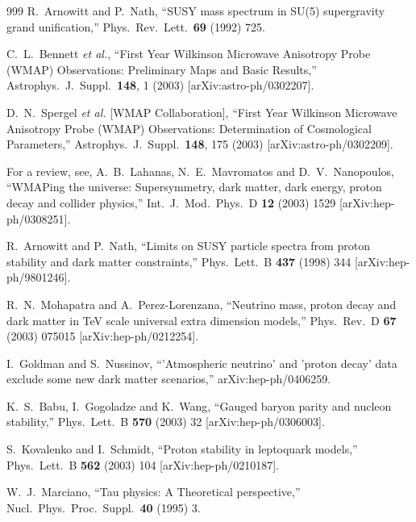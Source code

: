 \begin{thebibliography}{999}
  R.~Arnowitt and P.~Nath,
  ``SUSY mass spectrum in SU(5) supergravity grand unification,''
  Phys.\ Rev.\ Lett.\  {\bf 69} (1992) 725.

C.~L.~Bennett {\it et al.},
``First Year Wilkinson Microwave Anisotropy Probe (WMAP) Observations:
Preliminary Maps and Basic Results,''
Astrophys.\ J.\ Suppl.\  {\bf 148}, 1 (2003)
[arXiv:astro-ph/0302207].

D.~N.~Spergel {\it et al.}  [WMAP Collaboration],
``First Year Wilkinson Microwave Anisotropy Probe (WMAP) Observations:
Determination of Cosmological Parameters,''
Astrophys.\ J.\ Suppl.\  {\bf 148}, 175 (2003)
[arXiv:astro-ph/0302209].

For a review, see, 
  A.~B.~Lahanas, N.~E.~Mavromatos and D.~V.~Nanopoulos,
  ``WMAPing the universe: Supersymmetry, dark matter, dark energy, proton
  decay and collider physics,''
  Int.\ J.\ Mod.\ Phys.\ D {\bf 12} (2003) 1529
  [arXiv:hep-ph/0308251].

  R.~Arnowitt and P.~Nath,
  ``Limits on SUSY particle spectra from proton stability and dark matter
  constraints,''
  Phys.\ Lett.\ B {\bf 437} (1998) 344
  [arXiv:hep-ph/9801246].

  R.~N.~Mohapatra and A.~Perez-Lorenzana,
  ``Neutrino mass, proton decay and dark matter in TeV scale universal extra
  dimension models,''
  Phys.\ Rev.\ D {\bf 67} (2003) 075015
  [arXiv:hep-ph/0212254].

  I.~Goldman and S.~Nussinov,
  ``'Atmospheric neutrino' and 'proton decay' data exclude some new dark
  matter scenarios,''
  arXiv:hep-ph/0406259.

  K.~S.~Babu, I.~Gogoladze and K.~Wang,
  ``Gauged baryon parity and nucleon stability,''
  Phys.\ Lett.\ B {\bf 570} (2003) 32
  [arXiv:hep-ph/0306003].

  S.~Kovalenko and I.~Schmidt,
 ``Proton stability in leptoquark models,''
  Phys.\ Lett.\ B {\bf 562} (2003) 104
  [arXiv:hep-ph/0210187].

  W.~J.~Marciano,
  ``Tau physics: A Theoretical perspective,''
  Nucl.\ Phys.\ Proc.\ Suppl.\  {\bf 40} (1995) 3.


\end{thebibliography}
